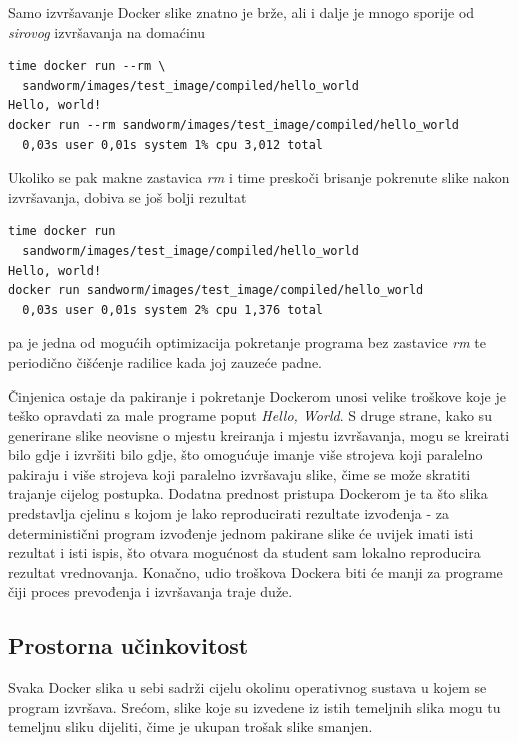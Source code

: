\documentclass[times, utf8, zavrsni]{fer}
\begin{document}
{{Samo izvršavanje Docker slike znatno je brže, ali i dalje je mnogo sporije od {\textit{sirovog}} izvršavanja na domaćinu

\begin{lstlisting}
time docker run --rm \
  sandworm/images/test_image/compiled/hello_world
Hello, world!
docker run --rm sandworm/images/test_image/compiled/hello_world
  0,03s user 0,01s system 1% cpu 3,012 total
\end{lstlisting}

Ukoliko se pak makne zastavica {\textit{rm}} i time preskoči brisanje pokrenute slike nakon izvršavanja, dobiva se još bolji rezultat

\begin{lstlisting}
time docker run
  sandworm/images/test_image/compiled/hello_world 
Hello, world!
docker run sandworm/images/test_image/compiled/hello_world
  0,03s user 0,01s system 2% cpu 1,376 total
\end{lstlisting}

pa je jedna od mogućih optimizacija pokretanje programa bez zastavice {\textit{rm}} te periodično čišćenje radilice kada joj zauzeće padne.

Činjenica ostaje da pakiranje i pokretanje Dockerom unosi velike troškove koje je teško opravdati za male programe poput {\textit{Hello, World}}. S druge strane, kako su generirane slike neovisne o mjestu kreiranja i mjestu izvršavanja, mogu se kreirati bilo gdje i izvršiti bilo gdje, što omogućuje imanje više strojeva koji paralelno pakiraju i više strojeva koji paralelno izvršavaju slike, čime se može skratiti trajanje cijelog postupka. Dodatna prednost pristupa Dockerom je ta što slika predstavlja cjelinu s kojom je lako reproducirati rezultate izvođenja - za deterministični program izvođenje jednom pakirane slike će uvijek imati isti rezultat i isti ispis, što otvara mogućnost da student sam lokalno reproducira rezultat vrednovanja. Konačno, udio troškova Dockera biti će manji za programe čiji proces prevođenja i izvršavanja traje duže.

\subsection{Prostorna učinkovitost}

Svaka Docker slika u sebi sadrži cijelu okolinu operativnog sustava u kojem se program izvršava. Srećom, slike koje su izvedene iz istih temeljnih slika mogu tu temeljnu sliku dijeliti, čime je ukupan trošak slike smanjen.

}}
\end{document}
